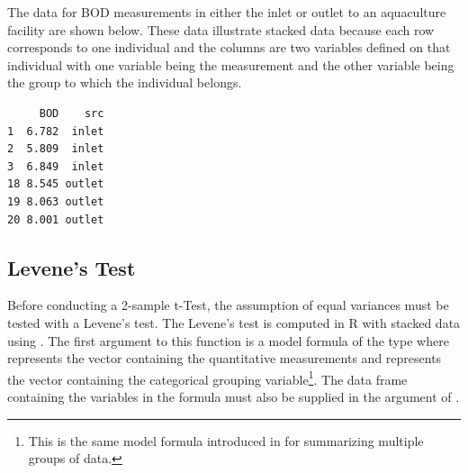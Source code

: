 \documentclass[10pt,openany]{book}\usepackage[]{graphicx}\usepackage[]{color}
\makeatletter
\newenvironment{kframe}{%
 \def\at@end@of@kframe{}%
 \ifinner\ifhmode%
  \def\at@end@of@kframe{\end{minipage}}%
  \begin{minipage}{\columnwidth}%
 \fi\fi%
 \def\FrameCommand##1{\hskip\@totalleftmargin \hskip-\fboxsep
 \colorbox{shadecolor}{##1}\hskip-\fboxsep
     \hskip-\linewidth \hskip-\@totalleftmargin \hskip\columnwidth}%
 \MakeFramed {\advance\hsize-\width
   \@totalleftmargin\z@ \linewidth\hsize
   \@setminipage}}%
 {\par\unskip\endMakeFramed%
 \at@end@of@kframe}
\newenvironment{knitrout}{}{} %
\makeatother
\begin{document}
The data for BOD measurements in either the inlet or outlet to an aquaculture facility are shown below.  These data illustrate stacked data because each row corresponds to one individual and the columns are two variables defined on that individual with one variable being the measurement and the other variable being the group to which the individual belongs.
\begin{knitrout}
\color{fgcolor}\begin{kframe}
\begin{verbatim}
     BOD    src
1  6.782  inlet
2  5.809  inlet
3  6.849  inlet
18 8.545 outlet
19 8.063 outlet
20 8.001 outlet
\end{verbatim}
\end{kframe}
\end{knitrout}


\vspace{-12pt}

\subsection{Levene's Test}
Before conducting a 2-sample t-Test, the assumption of equal variances must be tested with a Levene's test.  The Levene's test is computed in R with stacked data using .  The first argument to this function is a model formula of the type  where  represents the vector containing the quantitative measurements and  represents the vector containing the categorical grouping variable\footnote{This is the same model formula introduced in  for summarizing multiple groups of data.}.  The data frame containing the variables in the formula must also be supplied in the  argument of .
\end{document}
